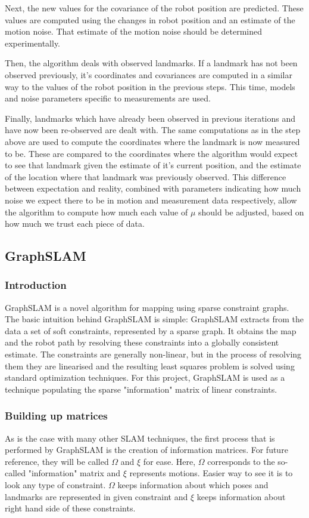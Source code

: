 \documentclass{ba-kecs}
\numberwithin{figure}{section}
\numberwithin{equation}{section}
\begin{document}
Next, the new values for the covariance of the robot position are predicted. These values are computed using the changes in robot position and an estimate of the motion noise. That estimate of the motion noise should be determined experimentally.

Then, the algorithm deals with observed landmarks. If a landmark has not been observed previously, it’s coordinates and covariances are computed in a similar way to the values of the robot position in the previous steps. This time, models and noise parameters specific to measurements are used.

Finally, landmarks which have already been observed in previous iterations and have now been re-observed are dealt with. The same computations as in the step above are used to compute the coordinates where the landmark is now measured to be. These are compared to the coordinates where the algorithm would expect to see that landmark given the estimate of it’s current position, and the estimate of the location where that landmark was previously observed. This difference between expectation and reality, combined with parameters indicating how much noise we expect there to be in motion and measurement data respectively, allow the algorithm to compute how much each value of $\mu$ should be adjusted, based on how much we trust each piece of data.

\subsection{GraphSLAM}

\subsubsection{Introduction}
GraphSLAM is a {\color[rgb]{1,0,0}novel} algorithm for mapping using sparse constraint graphs. The basic intuition behind GraphSLAM is simple: GraphSLAM extracts from the data a set of soft constraints, represented by a sparse graph. It obtains the map and the robot path by resolving these constraints into a globally consistent estimate. The constraints are generally non-linear, but in the process of resolving them they are linearised and the resulting least squares problem is solved using standard optimization techniques\cite{sik}. For this project, GraphSLAM is used as a technique populating the sparse "information" matrix of linear constraints.

\subsubsection{Building up matrices}
As is the case with many other SLAM techniques, the first process that is performed by GraphSLAM is the creation of information matrices. For future reference, they will be called $\Omega$ and $\xi$ for ease. Here, $\Omega$ corresponds to the so-called "information" matrix and $\xi$ represents motions. Easier way to see it is to look any type of constraint. $\Omega$ keeps information about which poses and landmarks are represented in given constraint and $\xi$ keeps information about right hand side of these constraints.
	
\end{document}
